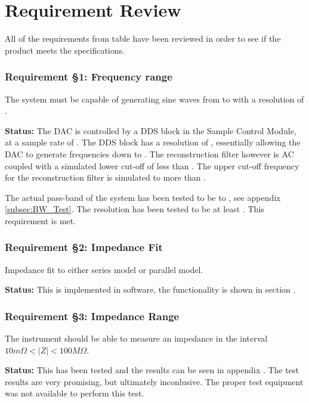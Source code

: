 \section{Requirement Review} \label{subsec:8_1_ReqReview}

All of the requirements from table  have been reviewed in order to see if the product meets the specifications.


\subsubsection*{Requirement §1: Frequency range}
The system must be capable of generating sine waves from  to  with a resolution of .

\textbf{Status:} The DAC is controlled by a DDS block in the Sample Control Module, at a sample rate of . The DDS block has a resolution of , essentially allowing the DAC to generate frequencies down to . The reconstruction filter however is AC coupled with a simulated lower cut-off of less than . The upper cut-off frequency for the reconstruction filter is simulated to more than .

The actual pass-band of the system has been tested to be  to , see appendix \ref{subsec:BW_Test}. The resolution has been tested to be at least . This requirement is met.
\nl
\nl

\subsubsection*{Requirement §2: Impedance Fit}
Impedance fit to either series model or parallel model.

\textbf{Status:} This is implemented in software, the functionality is shown in section .
\nl
\nl

\subsubsection*{Requirement §3: Impedance Range}
The instrument should be able to measure an impedance in the interval $10m\Omega < |Z| < 100M \Omega$. 

\textbf{Status:} This has been tested and the results can be seen in appendix . 
The test results are very promising, but ultimately inconlusive. The proper test equipment was not available to perform this test.
\nl
\nl

